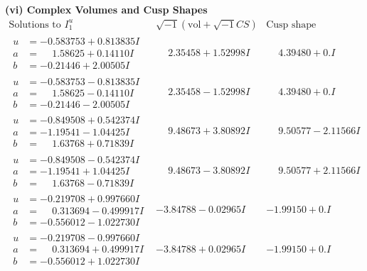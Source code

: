 \documentclass[1p]{elsarticle_modified}
\theoremstyle{definition}
\newcommand{\I}{\sqrt{-1}}
\begin{document}
\newpage\flushleft \textbf{(vi) Complex Volumes and Cusp Shapes}
$$\begin{array}{c|c|c}  
\text{Solutions to }I^u_{1}& \I (\text{vol} + \sqrt{-1}CS) & \text{Cusp shape}\\
 \hline 
\begin{aligned}
u &= -0.583753 + 0.813835 I \\
a &= \phantom{-}1.58625 + 0.14110 I \\
b &= -0.21446 + 2.00505 I\end{aligned}
 & \phantom{-}2.35458 + 1.52998 I & \phantom{-}4.39480 + 0. I\phantom{ +0.000000I} \\ \hline\begin{aligned}
u &= -0.583753 - 0.813835 I \\
a &= \phantom{-}1.58625 - 0.14110 I \\
b &= -0.21446 - 2.00505 I\end{aligned}
 & \phantom{-}2.35458 - 1.52998 I & \phantom{-}4.39480 + 0. I\phantom{ +0.000000I} \\ \hline\begin{aligned}
u &= -0.849508 + 0.542374 I \\
a &= -1.19541 - 1.04425 I \\
b &= \phantom{-}1.63768 + 0.71839 I\end{aligned}
 & \phantom{-}9.48673 + 3.80892 I & \phantom{-}9.50577 - 2.11566 I \\ \hline\begin{aligned}
u &= -0.849508 - 0.542374 I \\
a &= -1.19541 + 1.04425 I \\
b &= \phantom{-}1.63768 - 0.71839 I\end{aligned}
 & \phantom{-}9.48673 - 3.80892 I & \phantom{-}9.50577 + 2.11566 I \\ \hline\begin{aligned}
u &= -0.219708 + 0.997660 I \\
a &= \phantom{-}0.313694 - 0.499917 I \\
b &= -0.556012 - 1.022730 I\end{aligned}
 & -3.84788 - 0.02965 I & -1.99150 + 0. I\phantom{ +0.000000I} \\ \hline\begin{aligned}
u &= -0.219708 - 0.997660 I \\
a &= \phantom{-}0.313694 + 0.499917 I \\
b &= -0.556012 + 1.022730 I\end{aligned}
 & -3.84788 + 0.02965 I & -1.99150 + 0. I\phantom{ +0.000000I} \\ \hline\begin{aligned}

\end{aligned}
\end{array}$$
\end{document}
